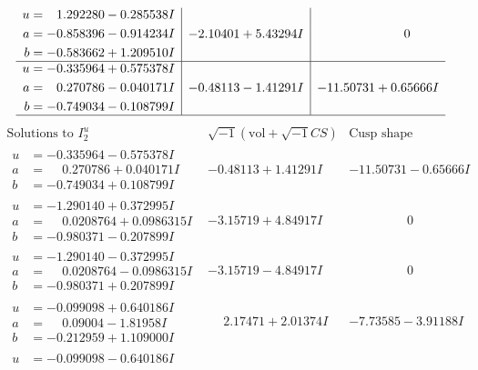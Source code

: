 \documentclass[1p]{elsarticle_modified}
\theoremstyle{definition}
\newcommand{\I}{\sqrt{-1}}
\begin{document}
$$\begin{array}{c|c|c}
\begin{aligned}
u &= \phantom{-}1.292280 - 0.285538 I \\
a &= -0.858396 - 0.914234 I \\
b &= -0.583662 + 1.209510 I\end{aligned}
 & -2.10401 + 5.43294 I & \phantom{-0.000000 } 0 \\ \hline\begin{aligned}
u &= -0.335964 + 0.575378 I \\
a &= \phantom{-}0.270786 - 0.040171 I \\
b &= -0.749034 - 0.108799 I\end{aligned}
 & -0.48113 - 1.41291 I & -11.50731 + 0.65666 I\\
 \hline 
 \end{array}$$\newpage$$\begin{array}{c|c|c}  
\text{Solutions to }I^u_{2}& \I (\text{vol} + \sqrt{-1}CS) & \text{Cusp shape}\\
 \hline 
\begin{aligned}
u &= -0.335964 - 0.575378 I \\
a &= \phantom{-}0.270786 + 0.040171 I \\
b &= -0.749034 + 0.108799 I\end{aligned}
 & -0.48113 + 1.41291 I & -11.50731 - 0.65666 I \\ \hline\begin{aligned}
u &= -1.290140 + 0.372995 I \\
a &= \phantom{-}0.0208764 + 0.0986315 I \\
b &= -0.980371 - 0.207899 I\end{aligned}
 & -3.15719 + 4.84917 I & \phantom{-0.000000 } 0 \\ \hline\begin{aligned}
u &= -1.290140 - 0.372995 I \\
a &= \phantom{-}0.0208764 - 0.0986315 I \\
b &= -0.980371 + 0.207899 I\end{aligned}
 & -3.15719 - 4.84917 I & \phantom{-0.000000 } 0 \\ \hline\begin{aligned}
u &= -0.099098 + 0.640186 I \\
a &= \phantom{-}0.09004 - 1.81958 I \\
b &= -0.212959 + 1.109000 I\end{aligned}
 & \phantom{-}2.17471 + 2.01374 I & -7.73585 - 3.91188 I \\ \hline\begin{aligned}
u &= -0.099098 - 0.640186 I \\

\end{aligned}
\end{array}$$
\end{document}
